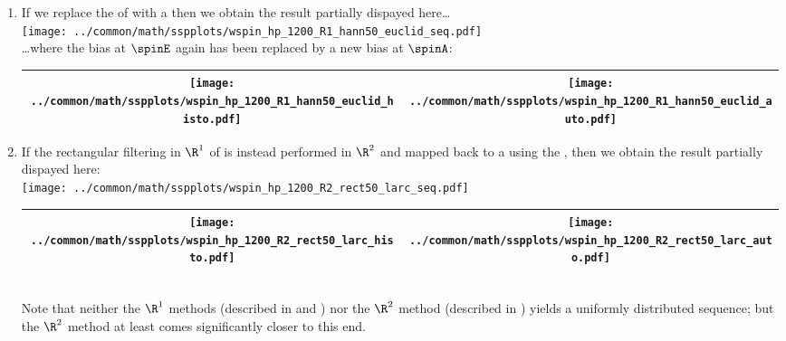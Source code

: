 \begin{example}
\begin{enumerate}
  \item \label{item:wspin_hp_hann50}\label{item:wspin_hp_hann50_R1}
        If we replace the  of 
        with a 
        then we obtain the result partially dispayed here\ldots
          \\\texttt{[image: ../common/math/sspplots/wspin\_hp\_1200\_R1\_hann50\_euclid\_seq.pdf]}\\
        \ldots where the bias at $\spinE$ again has been replaced by a new bias at $\spinA$:
          \\\begin{tabular}{|>{\scs}c|>{\scs}c|}
               \hline
               \texttt{[image: ../common/math/sspplots/wspin\_hp\_1200\_R1\_hann50\_euclid\_histo.pdf]}
              &\texttt{[image: ../common/math/sspplots/wspin\_hp\_1200\_R1\_hann50\_euclid\_auto.pdf]}
             \\\hline
          \end{tabular}


  \item \label{item:wspin_hp_rect50_R2_larc}
        If the rectangular filtering in $\R^1$ of 
        is instead performed in $\R^2$ 
        and mapped back to a  using the ,
        then we obtain the result partially dispayed here:
        \\\texttt{[image: ../common/math/sspplots/wspin\_hp\_1200\_R2\_rect50\_larc\_seq.pdf]}
        \\\begin{tabular}{|>{\scs}c|>{\scs}c|}
             \hline
             \texttt{[image: ../common/math/sspplots/wspin\_hp\_1200\_R2\_rect50\_larc\_histo.pdf]}
            &\texttt{[image: ../common/math/sspplots/wspin\_hp\_1200\_R2\_rect50\_larc\_auto.pdf]}
           \\\hline
        \end{tabular}\\
        Note that neither the $\R^1$ methods 
        (described in  and )
        nor the $\R^2$ method (described in )
        yields a uniformly distributed sequence; 
        but the $\R^2$ method at least comes significantly closer to this end.


\end{enumerate}
\end{example}
